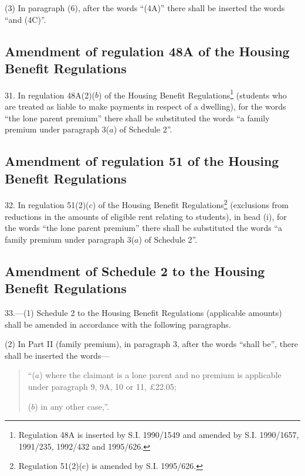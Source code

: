 \documentclass[12pt,a4paper]{article}
\begin{document}
(3) In paragraph (6), after the words “(4A)” there shall be inserted the words “and (4C)”.

\subsection[31. Amendment of regulation 48A of the Housing Benefit Regulations]{Amendment of regulation 48A of the Housing Benefit Regulations}

31.  In regulation 48A(2)($b$) of the Housing Benefit Regulations\footnote{\frenchspacing Regulation 48A is inserted by S.I. 1990/1549 and amended by S.I. 1990/1657, 1991/235, 1992/432 and 1995/626.} (students who are treated as liable to make payments in respect of a dwelling), for the words “the lone parent premium” there shall be substituted the words “a family premium under paragraph 3($a$) of Schedule 2”.

\subsection[32. Amendment of regulation 51 of the Housing Benefit Regulations]{Amendment of regulation 51 of the Housing Benefit Regulations}

32.  In regulation 51(2)($c$) of the Housing Benefit Regulations\footnote{\frenchspacing Regulation 51(2)(c) is amended by S.I. 1995/626.} (exclusions from reductions in the amounts of eligible rent relating to students), in head (i), for the words “the lone parent premium” there shall be substituted the words “a family premium under paragraph 3($a$) of Schedule 2”.

\subsection[33. Amendment of Schedule 2 to the Housing Benefit Regulations]{Amendment of Schedule 2 to the Housing Benefit Regulations}

\begin{sloppypar}
33.—(1) Schedule 2 to the Housing Benefit Regulations (applicable amounts) shall be amended in accordance with the following paragraphs.
\end{sloppypar}

(2) In Part II (family premium), in paragraph 3, after the words “shall be”, there shall be inserted the words—
\begin{quotation}
“($a$) where the claimant is a lone parent and no premium is applicable under paragraph 9, 9A, 10 or 11, £22.05;

($b$) in any other case,”.
\end{quotation}
\end{document}
